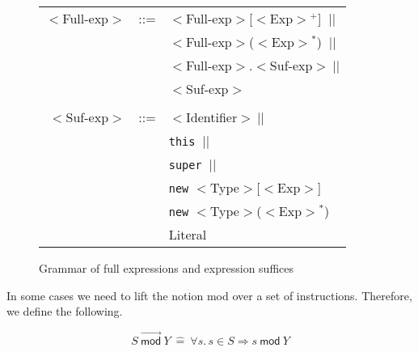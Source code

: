 \documentclass[a4paper]{llncs}
\newcommand{\defn}[1]{\:\hat{#1}\:}
\newcommand{\FullExp}{\(<\)\textsf{Full-exp}\(>\)}
\newcommand{\SufExp}{\(<\)\textsf{Suf-exp}\(>\)}
\newcommand{\Exp}{\(<\)\textsf{Exp}\(>\)}
\newcommand{\Identifier}{\(<\)\textsf{Identifier}\(>\)}
\newcommand{\MethodCall}{\(<\)\textsf{Identifier}\(>\)(\Exp\ldots\Exp)}
\newcommand{\Static}{\(<\)\textsf{StaticClass}\(>\)}
\newcommand{\Type}{\(<\)\textsf{Type}\(>\)}
\newcommand{\option}{\(\:||\)}
\newcommand{\MOD}[2]{\ensuremath{\mathit{#1}\:\mathsf{mod}\:\ensuremath{\mathit{#2}}}}
\newcommand{\MODS}[2]{\ensuremath{\mathit{#1}\:\overrightarrow{\mathsf{mod}}\:\mathit{#2}}}
\begin{document}
\begin{figure}[t]
\begin{tabular}{rcl}
\FullExp & ::= & \FullExp[\Exp\(^+\)] \option \\
         &     & \FullExp(\Exp\(^*\)) \option \\
         &     & \FullExp.\SufExp \option \\
         &     & \SufExp\\
\\
\SufExp  & ::= & \Identifier \option \\
         &     & \texttt{this} \option \\
         &     & \texttt{super} \option \\
         &     & \texttt{new} \Type [\Exp]\\
         &     & \texttt{new} \Type (\Exp\(^*\))\\
         &     & \textsf{Literal}
\end{tabular}
\caption{Grammar of full expressions and expression suffices}
\label{FigExpGrammar}
\end{figure}
In some cases we need to lift the notion \textsf{mod} over a set of
instructions. Therefore, we define the following.

\begin{definition}
\label{def-mod-lis}
\[\MODS{S}{Y} \defn{=}\forall s.\,s\in S\Rightarrow \MOD{s}{Y}\]
\end{definition}
\end{document}
